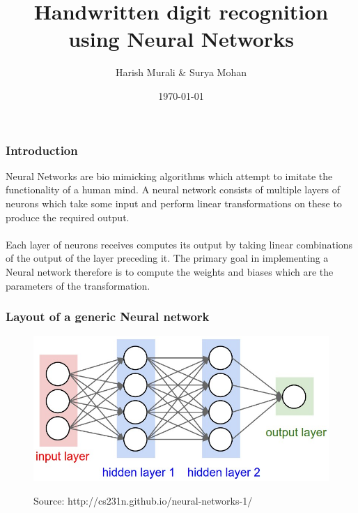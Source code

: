 \documentclass{beamer}
\title[SDES Project 2]{Handwritten digit recognition using Neural Networks}
\author{Harish Murali \& Surya Mohan}
\institute[iitb]
{
IIT Bombay
}
\date{\today}
\begin{document}

\begin{frame}
\titlepage
\end{frame}


\begin{frame}
\frametitle{Introduction}
Neural Networks are bio mimicking algorithms which attempt to imitate the functionality of a human mind. A neural network consists of multiple layers of neurons which take some input and perform linear transformations on these to produce the required output.
\\~\\
Each layer of neurons receives computes its output by taking linear combinations of the output of the layer preceding it. The primary goal in implementing a Neural network therefore is to compute the weights and biases which are the parameters of the transformation.
\end{frame}


\begin{frame}
\frametitle{Layout of a generic Neural network}
\begin{figure}
\includegraphics[width=0.8\linewidth]{nn}
\\
\caption{Source: http://cs231n.github.io/neural-networks-1/}
\end{figure}
\end{frame}

\end{document}
